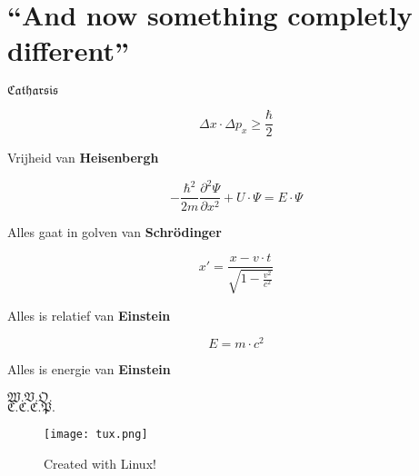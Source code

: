 \documentclass[a4paper,titlepage]{article}
\begin{document}
\appendix
\newpage
\printindex
\newpage
\section*{``And now something completly different''}
\begin{centering}
$\mathfrak{Catharsis}$
\end{centering}
\[
\Delta x\cdot\Delta p_x\geq\displaystyle\frac{\hbar}{2}
\]
\begin{flushright}
Vrijheid van \textbf{Heisenbergh}
\end{flushright}
\[
-\displaystyle\frac{\hbar^2}{2m}\displaystyle\frac{\partial^2\Psi}{\partial x^2}+U\cdot\Psi=E\cdot\Psi
\]
\begin{flushright}
Alles gaat in golven van \textbf{Schr\"odinger}
\end{flushright}
\[
x'=\displaystyle\frac{x-v\cdot t}{\sqrt{1-\displaystyle\frac{v^2}{c^2}}}
\]
\begin{flushright}
Alles is relatief van \textbf{Einstein}
\end{flushright}
\[
E=m\cdot c^2
\]
\begin{flushright}
Alles is energie van \textbf{Einstein}
\end{flushright}
$\mathfrak{W.V.O.}$\\%
$\mathfrak{C.C.C.P.}$%
\begin{figure*}[b]
\centering
\texttt{[image: tux.png]}
\caption{Created with Linux!}
\end{figure*}
\end{document}
